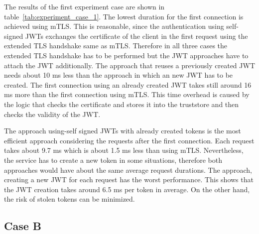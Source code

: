 The results of the first experiment case are shown in table~\ref{tab:experiment_case_1}.
The lowest duration for the first connection is achieved using mTLS.
This is reasonable, since the authentication using self-signed JWTs exchanges the certificate of the client in the first request using the extended TLS handshake same as mTLS.
Therefore in all three cases the extended TLS handshake has to be performed but the JWT approaches have to attach the JWT additionally.
The approach that reuses a previously created JWT needs about 10 ms less than the approach in which an new JWT has to be created.
The first connection using an already created JWT takes still around 16 ms more than the first connection using mTLS.
This time overhead is caused by the logic that checks the certificate and stores it into the truststore and then checks the validity of the JWT.

The approach using-self signed JWTs with already created tokens is the most efficient approach considering the requests after the first connection.
Each request takes about 9.7 ms which is about 1.5 ms less than using mTLS.
Nevertheless, the service has to create a new token in some situations, therefore both approaches would have about the same average request durations.
The approach, creating a new JWT for each request has the worst performance.
This shows that the JWT creation takes around 6.5 ms per token in average.
On the other hand, the risk of stolen tokens can be minimized.

\subsection{Case B}
